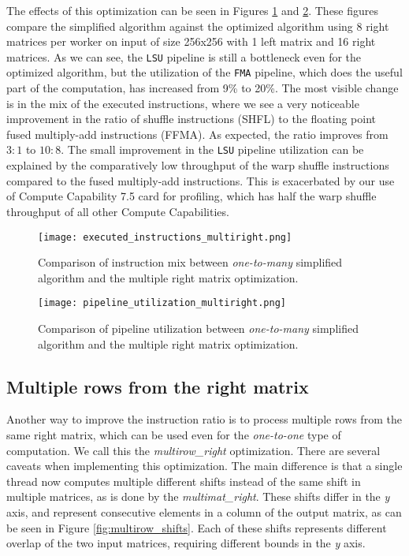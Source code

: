 The effects of this optimization can be seen in Figures \ref{fig:executed_instructions_multiright} and \ref{fig:pipeline_utilization_multiright}. These figures compare the simplified algorithm against the optimized algorithm using 8 right matrices per worker on input of size 256x256 with 1 left matrix and 16 right matrices. As we can see, the \texttt{LSU} pipeline is still a bottleneck even for the optimized algorithm, but the utilization of the \texttt{FMA} pipeline, which does the useful part of the computation, has increased from 9\% to 20\%. The most visible change is in the mix of the executed instructions, where we see a very noticeable improvement in the ratio of shuffle instructions (SHFL) to the floating point fused multiply-add instructions (FFMA). As expected, the ratio improves from $3 : 1$ to $10 : 8$. The small improvement in the \texttt{LSU} pipeline utilization can be explained by the comparatively low throughput of the warp shuffle instructions compared to the fused multiply-add instructions. This is exacerbated by our use of Compute Capability 7.5 card for profiling, which has half the warp shuffle throughput of all other Compute Capabilities.


\begin{figure}[ht]
	\centering
	\texttt{[image: executed\_instructions\_multiright.png]}
	\caption{Comparison of instruction mix between \textit{one-to-many} simplified algorithm and the multiple right matrix optimization.}
	\label{fig:executed_instructions_multiright}
\end{figure}

\begin{figure}[ht]
	\centering
	\texttt{[image: pipeline\_utilization\_multiright.png]}
	\caption{Comparison of pipeline utilization between \textit{one-to-many} simplified algorithm and the multiple right matrix optimization.}
	\label{fig:pipeline_utilization_multiright}
\end{figure}




\subsection{Multiple rows from the right matrix}
\label{sec:multirow_right}

Another way to improve the instruction ratio is to process multiple rows from the same right matrix, which can be used even for the \textit{one-to-one} type of computation. We call this the \textit{multirow\_right} optimization. There are several caveats when implementing this optimization. The main difference is that a single thread now computes multiple different shifts instead of the same shift in multiple matrices, as is done by the \textit{multimat\_right}. These shifts differ in the \textit{y} axis, and represent consecutive elements in a column of the output matrix, as can be seen in Figure \ref{fig:multirow_shifts}. Each of these shifts represents different overlap of the two input matrices, requiring different bounds in the \textit{y} axis.

